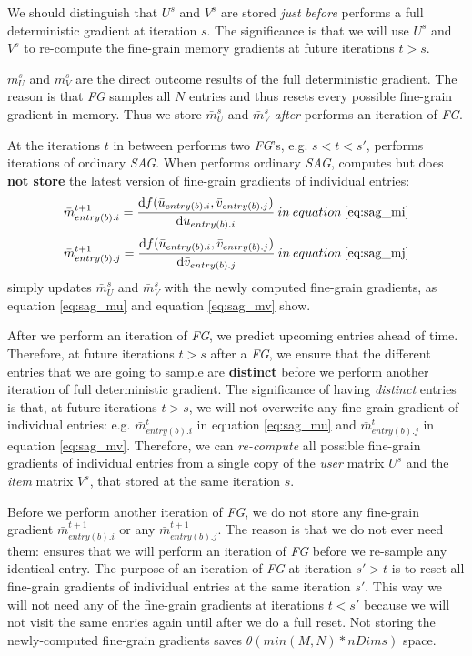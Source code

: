 We should distinguish that $U^{s}$ and $V^{s}$ are stored \emph{just before} \tool performs a full deterministic gradient at iteration $s$.
The significance is that we will use $U^{s}$ and $V^{s}$ to re-compute the fine-grain memory gradients at future iterations $t > s$.

$\bar{m}_{U}^{s}$ and $\bar{m}_{V}^{s}$ are the direct outcome results of the full deterministic gradient.  
The reason is that \emph{FG} samples all $N$ entries and thus resets every possible fine-grain gradient in memory.
Thus we store $\bar{m}_{U}^{s}$ and $\bar{m}_{V}^{s}$ \emph{after} \tool performs an iteration of \emph{FG}.

At the iterations $t$ in between \tool performs two \emph{FG}'s, e.g. $s < t < s'$, \tool performs iterations of ordinary \emph{SAG}.
When \tool performs ordinary \emph{SAG}, \tool computes but does \textbf{not store} the latest version of fine-grain gradients of individual entries: 
\[
\bar{m}_{entry(b).i}^{t+1} = \frac{\text{d}f(\bar{u}_{entry(b).i}, \bar{v}_{entry(b).j})}{\text{d}\bar{u}_{entry(b).i}}\:in\:equation\:\ref{eq:sag_mi}
\]
\[
\bar{m}_{entry(b).j}^{t+1} = \frac{\text{d}f(\bar{u}_{entry(b).i}, \bar{v}_{entry(b).j})}{\text{d}\bar{v}_{entry(b).j}}\:in\:equation\:\ref{eq:sag_mj}
\]
\tool simply updates $\bar{m}_{U}^{s}$ and $\bar{m}_{V}^{s}$ with the newly computed fine-grain gradients, as equation \ref{eq:sag_mu} and equation \ref{eq:sag_mv} show.


After we perform an iteration of \emph{FG}, we predict upcoming entries ahead of time.
Therefore, at future iterations $t > s$ after a \emph{FG}, we ensure that the different entries that we are going to sample are \textbf{distinct} before we perform another iteration of full deterministic gradient.
The significance of having \emph{distinct} entries is that, at future iterations $t > s$, we will not overwrite any fine-grain gradient of individual entries:
e.g. $\bar{m}_{entry(b).i}^{t}$ in equation \ref{eq:sag_mu} and $\bar{m}_{entry(b).j}^{t}$ in equation \ref{eq:sag_mv}.
Therefore, we can \emph{re-compute} all possible fine-grain gradients of individual entries 
from a single copy of the \emph{user} matrix $U^{s}$ and the \emph{item} matrix $V^{s}$, 
that \tool stored at the same iteration $s$.

Before we perform another iteration of \emph{FG}, we do not store any fine-grain gradient $\bar{m}_{entry(b).i}^{t+1}$ or any $\bar{m}_{entry(b).j}^{t+1}$.
The reason is that we do not ever need them: \tool ensures that we will perform an iteration of \emph{FG} before we re-sample any identical entry. 
The purpose of an iteration of \emph{FG} at iteration $s' > t$ is to reset all fine-grain gradients of individual entries at the same iteration $s'$.
This way we will not need any of the fine-grain gradients at iterations $t < s'$ because we will not visit the same entries again until after we do a full reset.
Not storing the newly-computed fine-grain gradients saves $\theta(min(M,N)*nDims)$ space.

